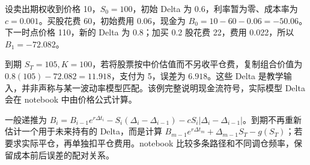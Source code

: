 设卖出期权收到价格 10，$S_0=100$，初始 Delta 为 $0.6$，利率暂为零、成本率为 $c=0.001$。买股花费 60，初始费用 0.06，现金为 $B_0=10-60-0.06=-50.06$。下一时点价格 110，新的 Delta 为 $0.8$；加买 0.2 股花费 22，费用 0.022，所以 $B_1=-72.082$。

到期 $S_T=105,K=100$，若将股票按中价估值而不另收平仓费，复制组合价值为 $0.8(105)-72.082=11.918$，支付为 5，误差为 $6.918$。这些 Delta 是教学输入，并非声称与某一波动率模型匹配。该例完整说明现金流符号，实际模型 Delta 会在 notebook 中由价格公式计算。

一般递推为 $B_i=B_{i-1}e^{r\Delta t_i}-S_i(\Delta_i-\Delta_{i-1})-cS_i|\Delta_i-\Delta_{i-1}|$。到期不再重新估计一个用于未来持有的 Delta，而是计算 $B_{m-1}e^{r\Delta t_m}+\Delta_{m-1}S_T-g(S_T)$；若要求实际平仓，再单独扣平仓费用。notebook 比较多条路径和不同调仓频率，保留成本前后误差的配对关系。




